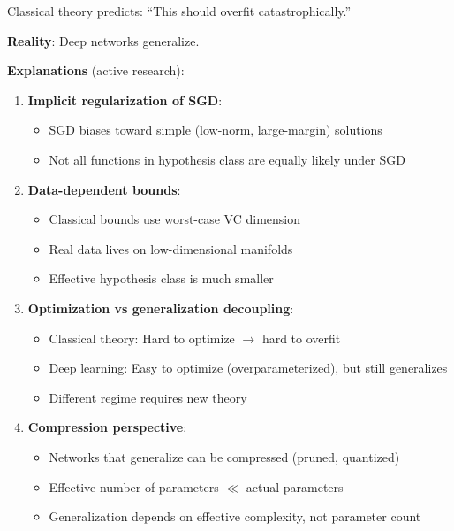 Classical theory predicts: ``This should overfit catastrophically.''

\textbf{Reality}: Deep networks generalize.

\textbf{Explanations} (active research):

\begin{enumerate}
    \item \textbf{Implicit regularization of SGD}:
    \begin{itemize}
        \item SGD biases toward simple (low-norm, large-margin) solutions
        \item Not all functions in hypothesis class are equally likely under SGD
    \end{itemize}

    \item \textbf{Data-dependent bounds}:
    \begin{itemize}
        \item Classical bounds use worst-case VC dimension
        \item Real data lives on low-dimensional manifolds
        \item Effective hypothesis class is much smaller
    \end{itemize}

    \item \textbf{Optimization vs generalization decoupling}:
    \begin{itemize}
        \item Classical theory: Hard to optimize $\rightarrow$ hard to overfit
        \item Deep learning: Easy to optimize (overparameterized), but still generalizes
        \item Different regime requires new theory
    \end{itemize}

    \item \textbf{Compression perspective}:
    \begin{itemize}
        \item Networks that generalize can be compressed (pruned, quantized)
        \item Effective number of parameters $\ll$ actual parameters
        \item Generalization depends on effective complexity, not parameter count
    \end{itemize}
\end{enumerate}

